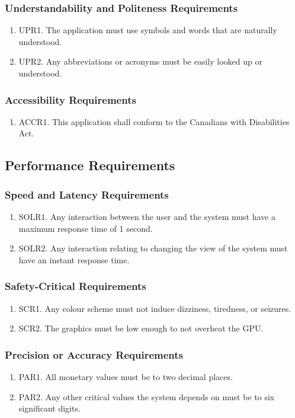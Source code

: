 \documentclass[]{article}
\begin{document}
\subsubsection{Understandability and Politeness Requirements}
\begin{enumerate}
	\item UPR1. The application must use symbols and words that are naturally understood.
	\item UPR2. Any abbreviations or acronyms must be easily looked up or understood.
\end{enumerate}

\subsubsection{Accessibility Requirements}
\begin{enumerate}
	\item ACCR1. This application shall conform to the Canadians with Disabilities Act.
\end{enumerate}

\subsection{Performance Requirements}
\subsubsection{Speed and Latency Requirements}
\begin{enumerate}
	\item SOLR1. Any interaction between the user and the system must have a maximum response time of 1 second.
	\item SOLR2. Any interaction relating to changing the view of the system must have an instant response time.
\end{enumerate}

\subsubsection{Safety-Critical Requirements}
\begin{enumerate}
	\item SCR1. Any colour scheme must not induce dizziness, tiredness, or seizures.
	\item SCR2. The graphics must be low enough to not overheat the GPU.
\end{enumerate}

\subsubsection{Precision or Accuracy Requirements}
\begin{enumerate}
	\item PAR1. All monetary values must be to two decimal places.
	\item PAR2. Any other critical values the system depends on must be to six significant digits.
\end{enumerate}
\end{document}
